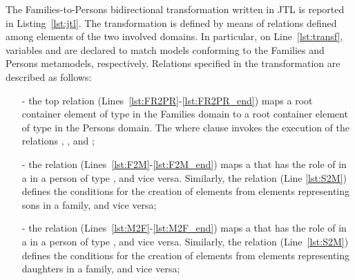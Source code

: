 The Families-to-Persons bidirectional transformation written in JTL is reported in
Listing~\ref{lst:jtl}. The transformation is defined by means of relations defined among
elements of the two involved domains. In particular, on Line~\ref{lst:transf}, variables  and
 are declared to match models conforming to the Families and Persons metamodels, respectively. Relations specified in the transformation are described as follows:

\begin{itemize}
    \itemsep.2em
    \item[-] the top relation  (Lines~{\ref{lst:FR2PR}-\ref{lst:FR2PR_end}})
        maps a root container element of type  in the Families domain to a root 
        container element of type  in the Persons domain. The where
        clause invokes the execution of the relations , ,  and
        ; 
    \item[-] the  relation (Lines~{\ref{lst:F2M}-\ref{lst:F2M_end}}) maps a  
     that has the role of  in a  in a person of type , and vice versa. Similarly, the relation  (Line {\ref{lst:S2M}})
     defines the conditions for the creation of  elements from  elements representing sons in a family, and vice versa;
	\item[-] the  relation (Lines~{\ref{lst:M2F}-\ref{lst:M2F_end}}) maps a   
	 that has the role of  in a  in a person of type , and vice versa. Similarly, the relation  (Line~{\ref{lst:S2M}})
	 defines the conditions for the creation of  elements from  elements representing daughters in a family, and vice versa;
\end{itemize}

